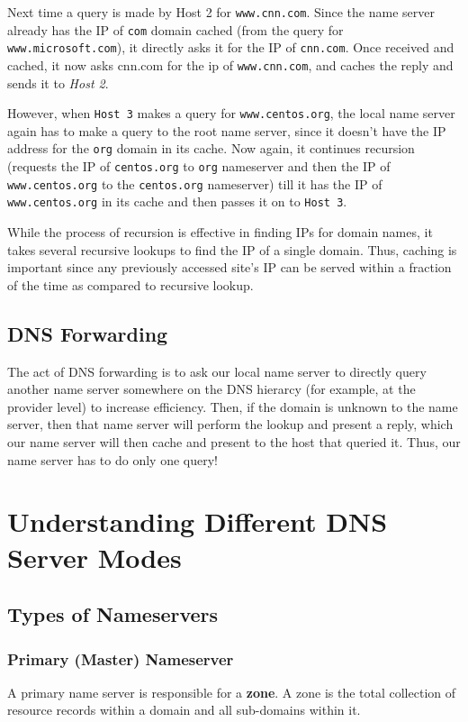 Next time a query is made by Host 2 for \verb|www.cnn.com|. Since the name server already has the IP of \verb|com| domain cached (from the query for \verb|www.microsoft.com|), it directly asks it for the IP of \verb|cnn.com|. Once received and cached, it now asks cnn.com for the ip of \verb|www.cnn.com|, and caches the reply and sends it to \textit{Host 2}. 

However, when \verb|Host 3| makes a query for \verb|www.centos.org|, the local name server again has to make a query to the root name server, since it doesn't have the IP address for the \verb|org| domain in its cache. Now again, it continues recursion (requests the IP of \verb|centos.org| to \verb|org| nameserver and then the IP of \verb|www.centos.org| to the \verb|centos.org| nameserver) till it has the IP of \verb|www.centos.org| in its cache and then passes it on to \verb|Host 3|. 

While the process of recursion is effective in finding IPs for domain names, it takes several recursive lookups to find the IP of a single domain. Thus, caching is important since any previously accessed site's IP can be served within a fraction of the time as compared to recursive lookup. 

\subsection{DNS Forwarding}
The act of DNS forwarding is to ask our local name server to directly query another name server somewhere on the DNS hierarcy (for example, at the provider level) to increase efficiency. Then, if the domain is unknown to the name server, then that name server will perform the lookup and present a reply, which our name server will then cache and present to the host that queried it. Thus, our name server has to do only one query!

\section{Understanding Different DNS Server Modes}
\subsection{Types of Nameservers}
\subsubsection{Primary (Master) Nameserver}
\vspace{-10pt}
A primary name server is responsible for a \textbf{zone}. A zone is the total collection of resource records within a domain and all sub-domains within it. 

